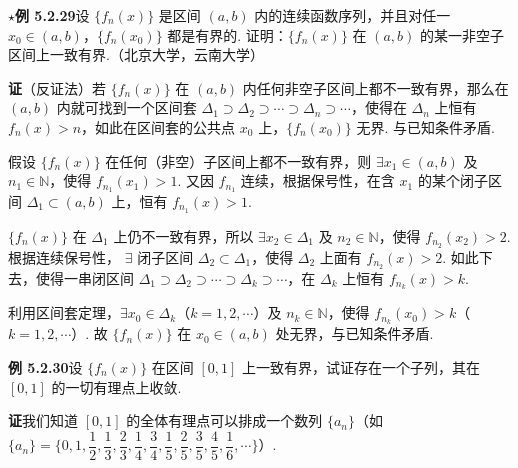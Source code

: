 \documentclass[UTF8,12pt,a4paper,fontset=fandol]{ctexart}
\begin{document}
\noindent\textbf{$\star$例 5.2.29}\quad 设 $\{f_n(x)\}$ 是区间 $(a,b)$ 内的连续函数序列，并且对任一
$x_0\in(a,b)$，$\{f_n(x_0)\}$ 都是有界的. 证明：$\{f_n(x)\}$ 在 $(a,b)$ 的某一非空子区间上一致有界.（北京大学，云南大学）

\noindent\textbf{证}\quad （反证法）若 $\{f_n(x)\}$ 在 $(a,b)$ 内任何非空子区间上都不一致有界，那么在
$(a,b)$ 内就可找到一个区间套
$\Delta_1\supset\Delta_2\supset\cdots\supset\Delta_n\supset\cdots$，使得在
$\Delta_n$ 上恒有 $f_n(x)>n$，如此在区间套的公共点 $x_0$ 上，$\{f_n(x_0)\}$ 无界. 与已知条件矛盾.

假设 $\{f_n(x)\}$ 在任何（非空）子区间上都不一致有界，则
$\exists x_1\in(a,b)$ 及 $n_1\in\mathbb N$，使得 $f_{n_1}(x_1)>1$. 又因
$f_{n_1}$ 连续，根据保号性，在含 $x_1$ 的某个闭子区间 $\Delta_1\subset(a,b)$ 上，恒有
$f_{n_1}(x)>1$.

$\{f_n(x)\}$ 在 $\Delta_1$ 上仍不一致有界，所以
$\exists x_2\in\Delta_1$ 及 $n_2\in\mathbb N$，使得 $f_{n_2}(x_2)>2$. 根据连续保号性，
$\exists$ 闭子区间 $\Delta_2\subset\Delta_1$，使得 $\Delta_2$ 上面有
$f_{n_2}(x)>2$. 如此下去，使得一串闭区间
$\Delta_1\supset\Delta_2\supset\cdots\supset\Delta_k\supset\cdots$，在
$\Delta_k$ 上恒有 $f_{n_k}(x)>k$.

利用区间套定理，$\exists x_0\in\Delta_k$（$k=1,2,\cdots$）及 $n_k\in\mathbb N$，使得
$f_{n_k}(x_0)>k$（$k=1,2,\cdots$）. 故 $\{f_n(x)\}$ 在 $x_0\in(a,b)$ 处无界，与已知条件矛盾.

\noindent\textbf{例 5.2.30}\quad 设 $\{f_n(x)\}$ 在区间 $[0,1]$ 上一致有界，试证存在一个子列，其在
$[0,1]$ 的一切有理点上收敛.

\noindent\textbf{证}\quad 我们知道 $[0,1]$ 的全体有理点可以排成一个数列 $\{a_n\}$（如
$\{a_n\}=\{0,1,\dfrac12,\dfrac13,\dfrac23,\dfrac14,\dfrac34,\dfrac15,\dfrac25,\dfrac35,\dfrac45,\dfrac16,\cdots\}$）.
\end{document}
